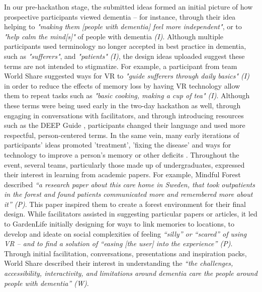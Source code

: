 In our pre-hackathon stage, the submitted ideas formed an initial picture of how prospective participants viewed dementia – for instance, through their idea helping to \textit{"making them [people with dementia] feel more independent"}, or to \textit{"help calm the mind[s]"} of people with dementia \textit{(I)}. Although multiple participants used terminology no longer accepted in best practice in dementia, such as \textit{"sufferers"}, and\textit{ "patients" (I)}, the design ideas uploaded suggest these terms are not intended to stigmatize. For example, a participant from team World Share suggested ways for VR to \textit{"guide sufferers through daily basics" (I)} in order to reduce the effects of memory loss by having VR technology allow them to repeat tasks such as \textit{"basic cooking, making a cup of tea" (I)}. Although these terms were being used early in the two-day hackathon as well, through engaging in conversations with facilitators, and through introducing resources such as the DEEP Guide \citep{diaries_deep_2020},  participants changed their language and used more respectful, person-centered terms. In the same vein, many early iterations of participants’ ideas promoted 'treatment', 'fixing the disease' and ways for technology to improve a person's memory or other deficits \citep{hendriks_valuing_2018}. Throughout the event, several teams, particularly those made up of undergraduates, expressed their interest in learning from academic papers. For example, Mindful Forest described \textit{“a research paper about this care home in Sweden, that took outpatients in the forest and found patients communicated more and remembered more about it” (P)}. This paper inspired them to create a forest environment for their final design. While facilitators assisted in suggesting particular papers or articles, it led to GardenLife initially designing for ways to link memories to locations, to develop and ideate on social complexities of feeling \textit{“silly” or “scared” of using VR – and to find a solution of “easing [the user] into the experience” (P)}. Through initial facilitation, conversations, presentations and inspiration packs, World Share described their interest in understanding the\textit{ “the challenges, accessibility, interactivity, and limitations around dementia care the people around people with dementia” (W)}.

